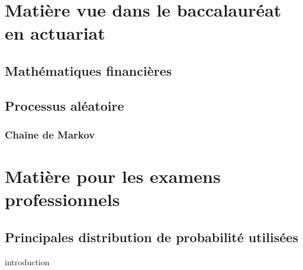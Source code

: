 \documentclass[12pt, french]{report}
\begin{document}
\part{Matière vue dans le baccalauréat en actuariat}




\chapter{Mathématiques financières}


\chapter{Processus aléatoire}

\section{Chaîne de Markov}
\label{sec:chaine-markov}



\part{Matière pour les examens professionnels}



\appendix
\chapter{Principales distribution de probabilité utilisées}
introduction
\end{document}
